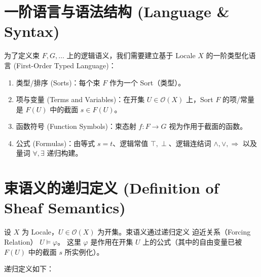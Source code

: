\documentclass[12pt,a4paper]{article}
\begin{document}
\section{一阶语言与语法结构 (Language \& Syntax)}

为了定义束 $F, G, \dots$ 上的逻辑语义，我们需要建立基于 Locale $X$ 的一阶类型化语言 (First-Order Typed Language)：

\begin{enumerate}
  \item 类型/排序 (Sorts)：每个束 $F$ 作为一个 Sort（类型）。
  \item 项与变量 (Terms and Variables)：在开集 $U \in \mathcal{O}(X)$ 上，Sort $F$ 的项/常量是 $F(U)$ 中的截面 $s \in F(U)$。
  \item 函数符号 (Function Symbols)：束态射 $f: F \to G$ 视为作用于截面的函数。
  \item 公式 (Formulas)：由等式 $s = t$、逻辑常值 $\top, \perp$、逻辑连结词 $\wedge, \vee, \Rightarrow$ 以及量词 $\forall, \exists$ 递归构建。
\end{enumerate}

\section{束语义的递归定义 (Definition of Sheaf Semantics)}

设 $X$ 为 Locale，$U \in \mathcal{O}(X)$ 为开集。束语义通过递归定义 迫近关系（Forcing Relation） $U \models \varphi$。
这里 $\varphi$ 是作用在开集 $U$ 上的公式（其中的自由变量已被 $F(U)$ 中的截面 $s$ 所实例化）。

递归定义如下：
\end{document}
